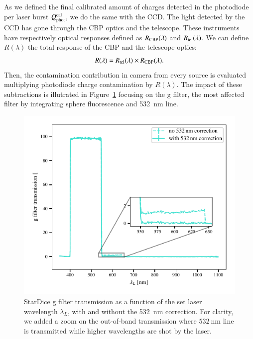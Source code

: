 As we defined the final calibrated amount of charges detected in the photodiode per laser burst $Q_{\mathrm{phot}}^{\rm cal}$, we do the same with the \SD CCD. The light detected by the \SD CCD has gone through the CBP optics and the \SD telescope. These instruments have respectively optical responses defined as $R_{\mathrm{CBP}}(\lambda)$ and $R_{\mathrm{tel}}(\lambda)$. We can define $R(\lambda)$ the total response of the CBP and the \SD telescope optics:
\begin{equation}
    R(\lambda) = R_{\mathrm{tel}}(\lambda) \times R_{\mathrm{CBP}}(\lambda).
    \label{eq:rtot}
\end{equation}
Then, the contamination contribution in \SD camera from every source is evaluated multiplying photodiode charge contamination by $R(\lambda)$.
The impact of these subtractions is illutrated in Figure~\ref{fig:g_filter_532} focusing on the \SD g filter, the most affected filter by integrating sphere fluorescence and \SI{532}{\nano\meter} line.

\begin{figure}[h]
    \centering
    \includegraphics[width=\columnwidth]{fig/g_filter_532.pdf}
    \caption{StarDice g filter transmission as a function of the set laser wavelength $\lambda_L$, with and without the \SI{532}{\nm} correction. For clarity, we added a zoom on the out-of-band transmission where $\SI{532}{\nm}$ line is transmitted while higher wavelengths are shot by the laser.}
    \label{fig:g_filter_532}
\end{figure}

